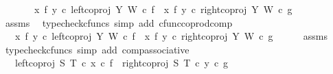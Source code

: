 \begin{isabellebody}
\ \ \ \ \ \ {\isacharequal}{\kern0pt}\ {\isacharparenleft}{\kern0pt}{\isacharparenleft}{\kern0pt}x\ {\isasymbowtie}\isactrlsub f\ y{\isacharparenright}{\kern0pt}\ {\isasymcirc}\isactrlsub c\ left{\isacharunderscore}{\kern0pt}coproj\ Y\ W\ {\isasymcirc}\isactrlsub c\ f{\isacharparenright}{\kern0pt}\ {\isasymamalg}\ {\isacharparenleft}{\kern0pt}{\isacharparenleft}{\kern0pt}x\ {\isasymbowtie}\isactrlsub f\ y{\isacharparenright}{\kern0pt}\ {\isasymcirc}\isactrlsub c\ right{\isacharunderscore}{\kern0pt}coproj\ Y\ W\ {\isasymcirc}\isactrlsub c\ g{\isacharparenright}{\kern0pt}{\isachardoublequoteclose}\isanewline
\ \ \ \ \isamarkupfalse%
\ assms\ \isamarkupfalse%
\ {\isacharparenleft}{\kern0pt}typecheck{\isacharunderscore}{\kern0pt}cfuncs{\isacharcomma}{\kern0pt}\ simp\ add{\isacharcolon}{\kern0pt}\ cfunc{\isacharunderscore}{\kern0pt}coprod{\isacharunderscore}{\kern0pt}comp{\isacharparenright}{\kern0pt}\isanewline
\ \ \isamarkupfalse%
\ \isamarkupfalse%
\ {\isachardoublequoteopen}{\isachardot}{\kern0pt}{\isachardot}{\kern0pt}{\isachardot}{\kern0pt}\ {\isacharequal}{\kern0pt}\ {\isacharparenleft}{\kern0pt}{\isacharparenleft}{\kern0pt}{\isacharparenleft}{\kern0pt}x\ {\isasymbowtie}\isactrlsub f\ y{\isacharparenright}{\kern0pt}\ {\isasymcirc}\isactrlsub c\ left{\isacharunderscore}{\kern0pt}coproj\ Y\ W{\isacharparenright}{\kern0pt}\ {\isasymcirc}\isactrlsub c\ f{\isacharparenright}{\kern0pt}\ {\isasymamalg}\ {\isacharparenleft}{\kern0pt}{\isacharparenleft}{\kern0pt}{\isacharparenleft}{\kern0pt}x\ {\isasymbowtie}\isactrlsub f\ y{\isacharparenright}{\kern0pt}\ {\isasymcirc}\isactrlsub c\ right{\isacharunderscore}{\kern0pt}coproj\ Y\ W{\isacharparenright}{\kern0pt}\ {\isasymcirc}\isactrlsub c\ g{\isacharparenright}{\kern0pt}{\isachardoublequoteclose}\isanewline
\ \ \ \ \isamarkupfalse%
\ assms\ \isamarkupfalse%
\ {\isacharparenleft}{\kern0pt}typecheck{\isacharunderscore}{\kern0pt}cfuncs{\isacharcomma}{\kern0pt}\ simp\ add{\isacharcolon}{\kern0pt}\ comp{\isacharunderscore}{\kern0pt}associative{}{\isacharparenright}{\kern0pt}\isanewline
\ \ \isamarkupfalse%
\ \isamarkupfalse%
\ {\isachardoublequoteopen}{\isachardot}{\kern0pt}{\isachardot}{\kern0pt}{\isachardot}{\kern0pt}\ {\isacharequal}{\kern0pt}\ {\isacharparenleft}{\kern0pt}{\isacharparenleft}{\kern0pt}left{\isacharunderscore}{\kern0pt}coproj\ S\ T\ {\isasymcirc}\isactrlsub c\ x{\isacharparenright}{\kern0pt}\ {\isasymcirc}\isactrlsub c\ f{\isacharparenright}{\kern0pt}\ {\isasymamalg}\ {\isacharparenleft}{\kern0pt}{\isacharparenleft}{\kern0pt}right{\isacharunderscore}{\kern0pt}coproj\ S\ T\ {\isasymcirc}\isactrlsub c\ y{\isacharparenright}{\kern0pt}\ {\isasymcirc}\isactrlsub c\ g{\isacharparenright}{\kern0pt}{\isachardoublequoteclose}\isanewline

\end{isabellebody}
